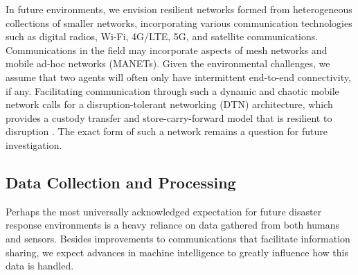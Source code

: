 \documentclass[]             %
{NASA}                       %
\theoremstyle{definition}
\begin{document}
In future environments, we envision resilient networks formed from
heterogeneous collections of smaller networks, incorporating various
communication technologies such as digital radios, Wi-Fi, 4G/LTE, 5G, and
satellite communications. Communications in the field may incorporate
aspects of mesh networks and mobile ad-hoc networks (MANETs). Given
the environmental challenges, we assume that two agents will often
only have intermittent end-to-end connectivity, if any. Facilitating
communication through such a dynamic and chaotic mobile network calls
for a disruption-tolerant networking (DTN) architecture, which
provides a custody transfer and store-carry-forward model that is
resilient to disruption \cite{2021:intro-dtn}. The exact form of such
a network remains a question for future investigation.

\subsection{Data Collection and Processing}
\label{ssec:data-collection}
Perhaps the most universally acknowledged expectation for future
disaster response environments is a heavy reliance on data
gathered from both humans and sensors. Besides improvements to
communications that facilitate information sharing, we expect advances
in machine intelligence to greatly influence how this data is
handled.
\end{document}
